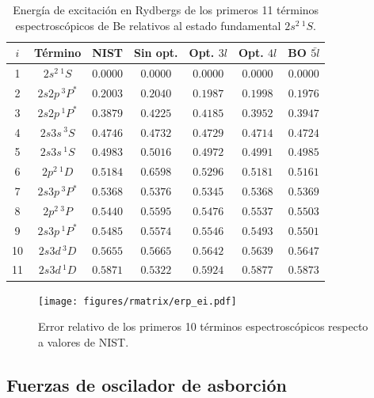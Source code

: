 \begin{table}
\centering
\begin{tabular}{|*{7}{c|}}
\hline 
$i$ & Término    & NIST      & Sin opt.  & Opt. $3l$  & Opt. $4l$  & BO $\bar{5l}$ \\
\hline 
\hline 
1 & $2s^2\,^1S$   & $0.0000$   & $0.0000$   & $0.0000$   & $0.0000$   & $0.0000$ \\
2 & $2s2p\,^3P^*$ & $0.2003$   & $0.2040$   & $0.1987$   & $0.1998$   & $0.1976$ \\
3 & $2s2p\,^1P^*$ & $0.3879$   & $0.4225$   & $0.4185$   & $0.3952$   & $0.3947$ \\
4 & $2s3s\,^3S$   & $0.4746$   & $0.4732$   & $0.4729$   & $0.4714$   & $0.4724$ \\
5 & $2s3s\,^1S$   & $0.4983$   & $0.5016$   & $0.4972$   & $0.4991$   & $0.4985$ \\
6 & $2p^2\,^1D$   & $0.5184$   & $0.6598$   & $0.5296$   & $0.5181$   & $0.5161$ \\
7 & $2s3p\,^3P^*$ & $0.5368$   & $0.5376$   & $0.5345$   & $0.5368$   & $0.5369$ \\
8 & $2p^2\,^3P$   & $0.5440$   & $0.5595$   & $0.5476$   & $0.5537$   & $0.5503$ \\
9 & $2s3p\,^1P^*$ & $0.5485$   & $0.5574$   & $0.5546$   & $0.5493$   & $0.5501$ \\
10 & $2s3d\,^3D$  & $0.5655$   & $0.5665$   & $0.5642$   & $0.5639$   & $0.5647$ \\
11 & $2s3d\,^1D$  & $0.5871$   & $0.5322$   & $0.5924$   & $0.5877$   & $0.5873$ \\
\hline
\end{tabular}
\caption[Energías de excitación de Be.]
{Energía de excitación en Rydbergs de los primeros 11 términos 
espectroscópicos de Be relativos al estado fundamental $2s^2\,^1S$.}
\label{tab:exener}
\end{table}

\begin{figure}[H]
\centering
\texttt{[image: figures/rmatrix/erp\_ei.pdf]} 
\caption[Error relativo de 10 términos espectroscópicos de Be.]
{Error relativo de los primeros 10 términos espectroscópicos respecto 
a valores de NIST.}
\label{fig:exener}
\end{figure}

\subsection{Fuerzas de oscilador de asborción}

